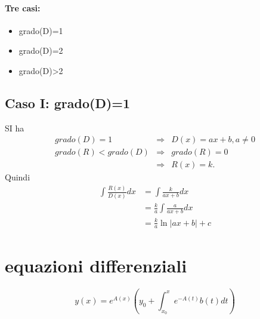 \documentclass{article}
\newcommand{\abs}[1]{\lvert#1\rvert}
\begin{document}
\paragraph{Tre casi:}
\begin{itemize}
\item grado(D)=1
\item grado(D)=2
\item grado(D)>2
\end{itemize}
\subsection{Caso I: grado(D)=1}
SI ha 
\begin{eqnarray*}
	grado(D)=1& \Rightarrow & D(x)=ax+b, a\neq 0\\
	grado(R)<grado(D)&\Rightarrow & grado(R)=0\\
	&\Rightarrow&R(x)=k.
\end{eqnarray*}
Quindi
\begin{eqnarray*}
	\int \frac{R(x)}{D(x)}dx&=\int \frac{k}{ax+b}dx\\
					 &=\frac{k}{a}\int \frac{a}{ax+b}dx\\
					 &=\frac{k}{a}\ln\abs{ax+b}+c
\end{eqnarray*}
\section{equazioni differenziali}
\begin{equation*}
	y(x)=e^{A(x)}\left(y_0+\int^x_{x_0}e^{-A(t)}b(t)dt\right)
\end{equation*}
\end{document}
